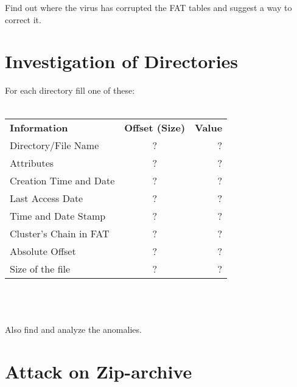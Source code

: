 \documentclass{article}
\begin{document}
Find out where the virus has corrupted the FAT tables and suggest a way to correct it.

\section{Investigation of Directories}

For each directory fill one of these:\\
\\
\begin{tabular}{l c r}
    \hline
    \textbf{Information} & \textbf{Offset (Size)} & \textbf{Value}\\
    Directory/File Name & ? & ? \\
    Attributes & ? & ? \\
    Creation Time and Date & ? & ? \\
    Last Access Date & ? & ? \\
    Time and Date Stamp & ? & ? \\
    Cluster’s Chain in FAT & ? & ? \\
    Absolute Offset & ? & ? \\
    Size of the file & ? & ? \\
    \hline
\end{tabular}
\\
\\
\\
Also find and analyze the anomalies.
\section{Attack on Zip-archive}
\end{document}
